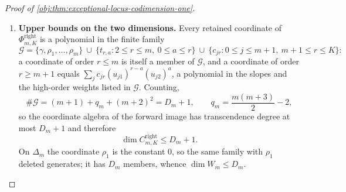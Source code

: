 \begin{proof}[Proof of \cref{obj:thm:exceptional-locus-codimension-one}]
\begin{enumerate}
\item \textbf{Upper bounds on the two dimensions.}  Every retained coordinate of \(\Phi^{\mathrm{right}}_{m,K}\) is a polynomial in the finite family
\[
\mathcal G=\{\gamma,\rho_1,\ldots,\rho_m\}
\ \cup\ \{t_{r,a}:2\le r\le m,\ 0\le a\le r\}
\ \cup\ \{c_{jr}:0\le j\le m+1,\ m+1\le r\le K\}:
\]
a coordinate of order \(r\le m\) is itself a member of \(\mathcal G\), and a coordinate of order \(r\ge m+1\) equals \(\sum_j c_{jr}(u_{j1})^{r-a}(u_{j2})^{a}\), a polynomial in the slopes and the high-order weights listed in \(\mathcal G\).  Counting,
\[
\#\mathcal G=(m+1)+q_m+(m+2)^2=D_m+1,
\qquad q_m=\frac{m(m+3)}{2}-2 ,
\]
so the coordinate algebra of the forward image has transcendence degree at most \(D_m+1\) and therefore
\[
\dim C^{\mathrm{right}}_{m,K}\le D_m+1 .
\]
On \(\Delta_m\) the coordinate \(\rho_1\) is the constant \(0\), so the same family with \(\rho_1\) deleted generates; it has \(D_m\) members, whence \(\dim W_m\le D_m\).


\end{enumerate}
\end{proof}
